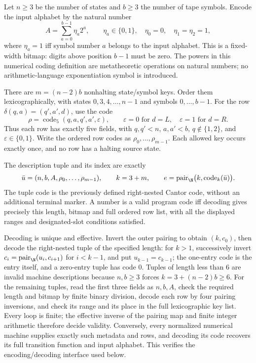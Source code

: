 \begin{definition}
\label{def:p04-program-serialization}
Let \(n\geq3\) be the number of states and \(b\geq3\) the number of
tape symbols.  Encode the input alphabet by the natural number
\[
 A=\sum_{a=0}^{b-1}\eta_a2^a,\qquad
 \eta_a\in\{0,1\},\quad \eta_0=0,\quad\eta_1=\eta_2=1,
\]
where \(\eta_a=1\) iff symbol number \(a\) belongs to the input
alphabet.  This is a fixed-width bitmap: digits above position \(b-1\)
must be zero.  The powers in this numerical coding definition are
metatheoretic operations on natural numbers; no arithmetic-language
exponentiation symbol is introduced.

There are \(m=(n-2)b\) nonhalting state/symbol keys.  Order them
lexicographically, with states \(0,3,4,\ldots,n-1\) and symbols
\(0,\ldots,b-1\).  For the row
\(\delta(q,a)=(q',a',d)\), use the code
\[
 \rho=\operatorname{code}_5(q,a,q',a',\varepsilon),\qquad
 \varepsilon=0\text{ for }d=L,\quad
 \varepsilon=1\text{ for }d=R.
\]
Thus each row has exactly five fields, with
\(q,q'<n\), \(a,a'<b\), \(q\notin\{1,2\}\), and
\(\varepsilon\in\{0,1\}\).  Write the ordered row codes as
\(\rho_0,\ldots,\rho_{m-1}\).  Each allowed key occurs exactly
once, and no row has a halting source state.

The description tuple and its index are exactly
\[
 \bar u=(n,b,A,\rho_0,\ldots,\rho_{m-1}),\qquad
 k=3+m,\qquad
 e=\operatorname{pair}_{\N}
       \bigl(k,\operatorname{code}_k(\bar u)\bigr).
\]
The tuple code is the previously defined right-nested Cantor code, without
an additional terminal marker.  A number is a valid program code iff
decoding gives precisely this length, bitmap and full ordered row list,
with all the displayed ranges and designated-slot conditions satisfied.
\end{definition}

Decoding is unique and effective.  Invert the outer pairing to obtain
\((k,c_0)\), then decode the right-nested tuple of the specified length:
for \(k>1\), successively invert
\(c_i=\operatorname{pair}_{\N}(u_i,c_{i+1})\) for \(i<k-1\),
and put \(u_{k-1}=c_{k-1}\); the one-entry code is the entry itself,
and a zero-entry tuple has code \(0\).  Tuples of length less than
\(6\) are invalid machine descriptions because \(n,b\geq3\)
forces \(k=3+(n-2)b\geq6\).  For the remaining tuples, read the
first three fields as \(n,b,A\), check the required length and bitmap
by finite binary division, decode each row by four pairing inversions,
and check its range and its place in the full lexicographic key list.
Every loop is finite; the effective inverse of the pairing map and
finite integer arithmetic therefore decide validity.  Conversely, every
normalized numerical machine supplies exactly such metadata and rows,
and decoding its code recovers its full transition function and input
alphabet.  This verifies the encoding/decoding interface used below.

